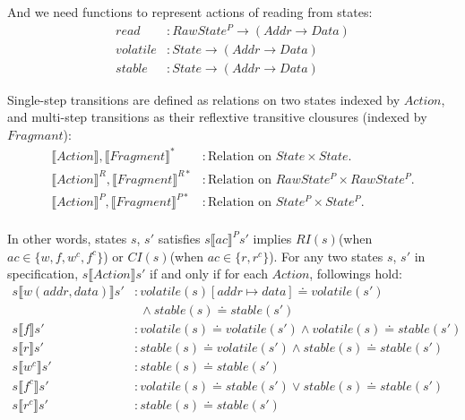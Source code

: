 \documentclass[a4paper,11pt]{article}
\theoremstyle{definition}
\begin{document}
And we need functions to represent actions of reading from states:
\begin{align*}
	read &: \mathit{RawState^P} \to (\mathit{Addr} \to \mathit{Data})\\
	volatile &: \mathit{State} \to (\mathit{Addr} \to \mathit{Data})\\
	stable &: \mathit{State} \to (\mathit{Addr} \to \mathit{Data})
\end{align*}

\newpage

Single-step transitions are defined as relations on two states indexed by $\mathit{Action}$, and multi-step transitions as their reflextive transitive clousures (indexed by $\mathit{Fragmant}$):
\begin{align*}
	\llbracket \mathit{Action} \rrbracket, \llbracket \mathit{Fragment} \rrbracket^* &: \text{Relation on $\mathit{State \times State}$.}\\
	\llbracket \mathit{Action} \rrbracket^R, \llbracket \mathit{Fragment} \rrbracket^{R*} &: \text{Relation on $\mathit{RawState^P \times RawState^P}$.}\\
	\llbracket \mathit{Action} \rrbracket^P, \llbracket \mathit{Fragment} \rrbracket^{P*} &: \text{Relation on $\mathit{State^P \times State^P}$.}\\
\end{align*}

In other words, states $s$, $s'$ satisfies $s \llbracket \mathit{ac} \rrbracket^P s'$ implies $\mathit{RI(s)}$(when $\mathit{ac} \in \{w, f, w^c, f^c\}$) or $\mathit{CI(s)}$(when $\mathit{ac} \in \{r, r^c\}$). For any two states $s$, $s'$ in specification, $s \llbracket \mathit{Action} \rrbracket s'$ if and only if for each $\mathit{Action}$, followings hold:
\begin{align*}
	s \llbracket w(addr, data) \rrbracket s' &: \mathit{volatile(s)[addr \mapsto data]} \doteq \mathit{volatile(s')}\\
	& \ \  \land stable(s) \doteq stable(s')\\
	s \llbracket f \rrbracket s' &: \mathit{volatile(s)} \doteq \mathit{volatile(s')} \land \mathit{volatile(s)} \doteq \mathit{stable(s')}\\
	s \llbracket r \rrbracket s' &: \mathit{stable(s)} \doteq \mathit{volatile(s')} \land \mathit{stable(s)} \doteq \mathit{stable(s')}\\
	s \llbracket w^c \rrbracket s' &: \mathit{stable(s)} \doteq \mathit{stable(s')}\\
	s \llbracket f^c \rrbracket s' &: \mathit{volatile(s)} \doteq \mathit{stable(s')} \lor \mathit{stable(s)} \doteq \mathit{stable(s')}\\
	s \llbracket r^c \rrbracket s' &: \mathit{stable(s)} \doteq \mathit{stable(s')}
\end{align*}
\end{document}
